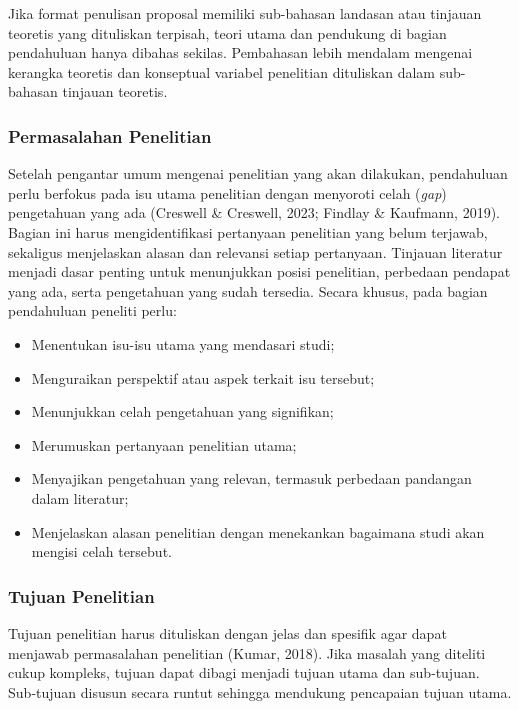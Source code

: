 \documentclass[
  indonesian,
  letterpaper,
  DIV=11,
  numbers=noendperiod]{scrreprt}
\providecommand{\tightlist}{%
  \setlength{\itemsep}{0pt}\setlength{\parskip}{0pt}}
\begin{document}
Jika format penulisan proposal memiliki sub-bahasan landasan atau
tinjauan teoretis yang dituliskan terpisah, teori utama dan pendukung di
bagian pendahuluan hanya dibahas sekilas. Pembahasan lebih mendalam
mengenai kerangka teoretis dan konseptual variabel penelitian dituliskan
dalam sub-bahasan tinjauan teoretis.~

\subsubsection{Permasalahan Penelitian}\label{permasalahan-penelitian}

Setelah pengantar umum mengenai penelitian yang akan dilakukan,
pendahuluan perlu berfokus pada isu utama penelitian dengan menyoroti
celah (\emph{gap}) pengetahuan yang ada (Creswell \& Creswell, 2023;
Findlay \& Kaufmann, 2019). Bagian ini harus mengidentifikasi pertanyaan
penelitian yang belum terjawab, sekaligus menjelaskan alasan dan
relevansi setiap pertanyaan. Tinjauan literatur menjadi dasar penting
untuk menunjukkan posisi penelitian, perbedaan pendapat yang ada, serta
pengetahuan yang sudah tersedia. Secara khusus, pada bagian pendahuluan
peneliti perlu:

\begin{itemize}
\tightlist
\item
  Menentukan isu-isu utama yang mendasari studi;
\item
  Menguraikan perspektif atau aspek terkait isu tersebut;
\item
  Menunjukkan celah pengetahuan yang signifikan;
\item
  Merumuskan pertanyaan penelitian utama;
\item
  Menyajikan pengetahuan yang relevan, termasuk perbedaan pandangan
  dalam literatur;
\item
  Menjelaskan alasan penelitian dengan menekankan bagaimana studi akan
  mengisi celah tersebut.
\end{itemize}

\subsubsection{Tujuan Penelitian}\label{tujuan-penelitian}

Tujuan penelitian harus dituliskan dengan jelas dan spesifik agar dapat
menjawab permasalahan penelitian (Kumar, 2018). Jika masalah yang
diteliti cukup kompleks, tujuan dapat dibagi menjadi tujuan utama dan
sub‑tujuan. Sub‑tujuan disusun secara runtut sehingga mendukung
pencapaian tujuan utama.
\end{document}
